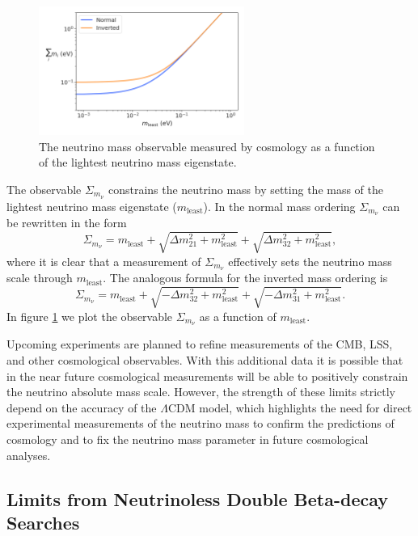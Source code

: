 \begin{figure}[htbp]
    \centering
    \includegraphics[width=0.6\textwidth]{figs/Chapter-2/230301_cosmology_nu_mass_observable.png}
    \caption{The neutrino mass observable measured by cosmology as a function of the lightest neutrino mass eigenstate.}
    \label{fig:chap2-nu-mass-cosmo}
\end{figure}

The observable $\Sigma_{m_\nu}$ constrains the neutrino mass by setting the mass of the lightest neutrino mass eigenstate ($m_\mathrm{least}$). In the normal mass ordering $\Sigma_{m_\nu}$ can be rewritten in the form 
\begin{equation}
    \Sigma_{m_\nu} = m_\mathrm{least} + \sqrt{\Delta m_{21}^2+m_\mathrm{least}^2}+\sqrt{\Delta m_{32}^2+m_\mathrm{least}^2},
\end{equation}
where it is clear that a measurement of $\Sigma_{m_\nu}$ effectively sets the neutrino mass scale through $m_\mathrm{least}$. The analogous formula for the inverted mass ordering is 
\begin{equation}
    \Sigma_{m_\nu} = m_\mathrm{least}+\sqrt{-\Delta m_{32}^2+m_\mathrm{least}^2}+\sqrt{-\Delta m_{31}^2+m_\mathrm{least}^2}.
\end{equation}
In figure \ref{fig:chap2-nu-mass-cosmo} we plot the observable $\Sigma_{m_\nu}$ as a function of $m_\mathrm{least}$.

Upcoming experiments \cite{cmb_s4} are planned to refine measurements of the CMB, LSS, and other cosmological observables. With this additional data it is possible that in the near future cosmological measurements will be able to positively constrain the neutrino absolute mass scale. However, the strength of these limits strictly depend on the accuracy of the $\Lambda$CDM model, which highlights the need for direct experimental measurements of the neutrino mass to confirm the predictions of cosmology and to fix the neutrino mass parameter in future cosmological analyses.

\subsection{Limits from Neutrinoless Double Beta-decay Searches}

